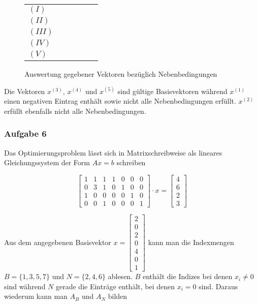 \documentclass[a4paper, 12pt]{report}
\newcommand{\cmark}{\ding{51}}%
\newcommand{\xmark}{\ding{55}}%
\begin{document}
\begin{figure}[H]
\begin{tabular}{l|c c c c c}
    \hline
    $(I)$ & \xmark & \cmark & \cmark & \cmark & \cmark \\
    $(II)$ & \cmark & \xmark & \cmark & \cmark & \cmark \\
    $(III)$ & \cmark & \xmark & \cmark & \cmark & \cmark \\
    $(IV)$ & \cmark & \cmark & \cmark & \cmark & \cmark \\
    $(V)$ & \xmark & \cmark & \cmark & \cmark & \cmark \\
  \end{tabular}
  \caption{Auswertung gegebener Vektoren bezüglich Nebenbedingungen}
\end{figure}

Die Vektoren $x^{(3)}$, $x^{(4)}$ und $x^{(5)}$ sind gültige Basisvektoren während $x^{(1)}$ einen negativen Eintrag enthält
sowie nicht alle Nebenbedingungen erfüllt. $x^{(2)}$ erfüllt ebenfalls nicht alle Nebenbedingungen.

\subsubsection{Aufgabe 6}

Das Optimierungsproblem lässt sich in Matrixschreibweise als lineares Gleichungssystem der Form $Ax = b$ schreiben

$$ \begin{bmatrix}1 & 1 & 1 & 1 & 0 & 0 & 0\\0 & 3 & 1 & 0 & 1 & 0 & 0\\1 & 0 & 0 & 0 & 0 & 1 & 0\\0 & 0 & 1 & 0 & 0 & 0 & 1\end{bmatrix} \cdot x = \begin{bmatrix}4\\6\\2\\3\end{bmatrix} $$

Aus dem angegebenen Basisvektor $x = \begin{bmatrix}2\\0\\2\\0\\4\\0\\1\end{bmatrix}$ kann man die Indexmengen
$B = \{1, 3, 5, 7\}$ und $N = \{2, 4, 6\}$ ablesen. $B$ enthält die Indizes bei denen $x_i \neq 0$ sind
während $N$ gerade die Einträge enthält, bei denen $x_i = 0$ sind. Daraus wiederum kann man $A_B$ und $A_N$ bilden
\end{document}
